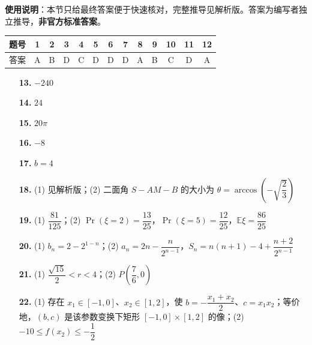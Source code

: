 
\begin{gknotice}
\textbf{使用说明}：本节只给最终答案便于快速核对，完整推导见解析版。答案为编写者独立推导，\textbf{非官方标准答案}。
\end{gknotice}

\begin{center}\begin{tabular}{ccccccccccccc}
\toprule
题号 & 1 & 2 & 3 & 4 & 5 & 6 & 7 & 8 & 9 & 10 & 11 & 12 \\
\midrule
答案 & A & B & D & C & D & D & D & A & B & C & D & A \\
\bottomrule
\end{tabular}\end{center}

\begin{itemize}[leftmargin=2.6em]
  \item[\textbf{13.}] $-240$
  \item[\textbf{14.}] $24$
  \item[\textbf{15.}] $20\pi$
  \item[\textbf{16.}] $-8$
\end{itemize}

\begin{itemize}[leftmargin=2.6em]
  \item[\textbf{17.}] $b=4$
  \item[\textbf{18.}] (1) 见解析版；(2) 二面角 $S-AM-B$ 的大小为 $\theta=\arccos\left(-\sqrt{\dfrac23}\right)$
  \item[\textbf{19.}] (1) $\dfrac{81}{125}$；(2) $\Pr(\xi=2)=\dfrac{13}{25}$，$\Pr(\xi=5)=\dfrac{12}{25}$，$\mathbb E\xi=\dfrac{86}{25}$
  \item[\textbf{20.}] (1) $b_n=2-2^{1-n}$；(2) $a_n=2n-\dfrac{n}{2^{n-1}}$，$S_n=n(n+1)-4+\dfrac{n+2}{2^{n-1}}$
  \item[\textbf{21.}] (1) $\dfrac{\sqrt{15}}2<r<4$；(2) $P\left(\dfrac76,0\right)$
  \item[\textbf{22.}] (1) 存在 $x_1\in[-1,0]$、$x_2\in[1,2]$，使 $b=-\dfrac{x_1+x_2}{2}$、$c=x_1x_2$；等价地，$(b,c)$ 是该参数变换下矩形 $[-1,0]\times[1,2]$ 的像；(2) $-10\leqslant f(x_2)\leqslant-\dfrac12$
\end{itemize}
